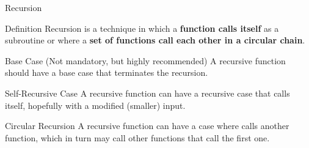 \begin{frame}{Recursion}
    \begin{block}{Definition}
        Recursion is a technique in which a \textbf{function calls itself} as a subroutine or where a \textbf{set of functions call each other in a circular chain}.
    \end{block}
    \begin{block}{Base Case (Not mandatory, but highly recommended)}
        A recursive function should have a base case that terminates the recursion.
    \end{block}
    \begin{block}{Self-Recursive Case}
        A recursive function can have a recursive case that calls itself, hopefully with a modified (smaller) input.
    \end{block}
    \begin{block}{Circular Recursion}
        A recursive function can have a case where calls another function, which in turn may call other functions that call the first one.
    \end{block}
\end{frame}